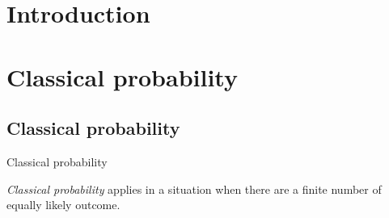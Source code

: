 



\section{Introduction}

\section{Classical probability}

\subsection{Classical probability}

%
\begin{note}
  \begin{field}
    Classical probability
  \end{field}
  \begin{field}
    \begin{defi}
      \emph{Classical probability} applies in a situation when there are a finite number of equally likely outcome.
    \end{defi}
  \end{field}
  \xplain{}%
\end{note}

